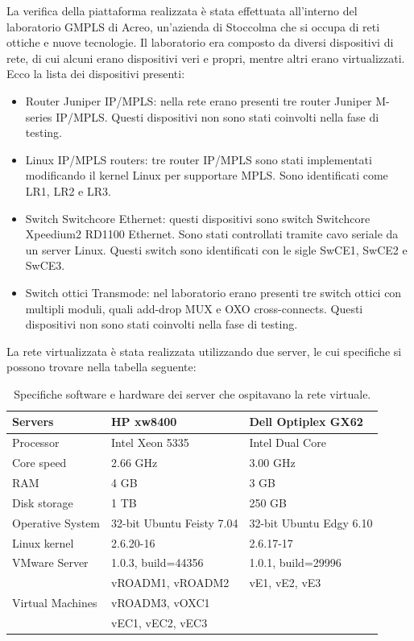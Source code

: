 \documentclass[10pt,a4paper]{report}
\begin{document}
La verifica della piattaforma realizzata è stata effettuata
all'interno del laboratorio GMPLS di Acreo, un'azienda di Stoccolma
che si occupa di reti ottiche e nuove tecnologie. Il laboratorio era
composto da diversi dispositivi di rete, di cui alcuni erano
dispositivi veri e propri, mentre altri erano virtualizzati. Ecco la
lista dei dispositivi presenti:

\begin{itemize}
\item Router Juniper IP/MPLS: nella rete erano presenti tre router
  Juniper M-series IP/MPLS. Questi dispositivi non sono stati
  coinvolti nella fase di testing.
\item Linux IP/MPLS routers: tre router IP/MPLS sono stati
  implementati modificando il kernel Linux per supportare MPLS. Sono
  identificati come LR1, LR2 e LR3.
\item Switch Switchcore Ethernet: questi dispositivi sono switch
  Switchcore Xpeedium2 RD1100 Ethernet. Sono stati controllati tramite
  cavo seriale da un server Linux. Questi switch sono identificati con
  le sigle SwCE1, SwCE2 e SwCE3.
\item Switch ottici Transmode: nel laboratorio erano presenti tre
  switch ottici con multipli moduli, quali add-drop MUX e OXO
  cross-connects. Questi dispositivi non sono stati coinvolti nella
  fase di testing.
\end{itemize}

La rete virtualizzata è stata realizzata utilizzando due server, le
cui specifiche si possono trovare nella tabella seguente:


\begin{table}[!htbp]
  \begin{center}
    \begin{tabular}{|l|l|l|}
      \hline
      Servers & \textbf{HP xw8400} & \textbf{Dell Optiplex GX62} \\
      \hline \hline
      Processor & Intel Xeon 5335 & Intel Dual Core\\ \hline
      Core speed & 2.66 GHz & 3.00 GHz \\ \hline
      RAM & 4 GB & 3 GB \\ \hline
      Disk storage & 1 TB & 250 GB \\ \hline
      Operative System & 32-bit Ubuntu Feisty 7.04 & 32-bit Ubuntu Edgy
      6.10 \\ \hline
      Linux kernel & 2.6.20-16 & 2.6.17-17 \\ \hline
      VMware Server & 1.0.3, build=44356 & 1.0.1, build=29996 \\ \hline
      \multirow{3}{*}{Virtual Machines} & vROADM1, vROADM2 & vE1, vE2,
      vE3 \\
      & vROADM3, vOXC1 & \\
      & vEC1, vEC2, vEC3 & \\ \hline
    \end{tabular}
    \caption[]{Specifiche software e hardware dei server che
      ospitavano la rete virtuale.}
  \end{center}
\end{table}
\end{document}
